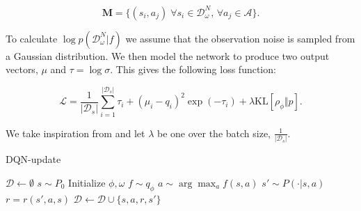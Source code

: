 \documentclass[]{uai2022} %
\newcommand{\R}{\mathbb{R}}
\newcommand{\D}{\mathcal{D}}
\newcommand{\state}{\mathcal{S}}
\newcommand{\action}{\mathcal{A}}
\newcommand{\KL}{\mathrm{KL}}
\begin{document}
\begin{equation}
    \mathbf{M} = \{(s_i, a_j) \; \forall s_i \in \D_\omega^N,\, \forall a_j \in \action\}. 
\end{equation}

To calculate \(\log p(\D_\omega^N \vert f)\) we assume that the observation noise is sampled
from a Gaussian distribution. We then model the network to produce two output vectors,
\(\mu\) and \(\tau = \log \sigma\). This gives the following loss function:

\begin{equation}
    \mathcal{L} = \frac{1}{\lvert \D_s \rvert}\sum_{i=1}^{\lvert \D_s \rvert} \tau_i + \left( \mu_i - q_i \right)^2
    \exp (-\tau_i) + \lambda \KL[\rho_\phi \Vert p].
\end{equation}

We take inspiration from \cite{sun_functional_2019} and let \(\lambda\) be one over
the batch size, \(\frac{1}{\lvert \D_s \rvert}\).




\begin{algorithm}
\caption{DQN-update}
\begin{algorithmic}
    \State \(\D \gets \emptyset\)
    \State \(s \sim P_0\)
    \State Initialize \(\phi, \omega\)
        \State \(f \sim q_\phi\)
        \State \(a \sim \arg\max_a f(s,a)\)
        \State \(s' \sim P(\cdot \vert s,a)\)
        \State \(r = r(s',a,s)\)
        \State \(\D \gets \D \cup \{s,a,r,s'\}\)
        \State \Call{UpdateNet}{$\phi, \omega, \D$}
    \EndWhile
\end{algorithmic}
\end{algorithm}
\end{document}
